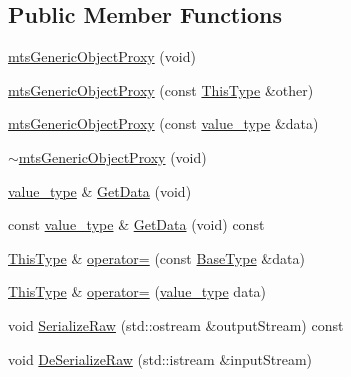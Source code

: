 \subsection*{Public Member Functions}
\begin{DoxyCompactItemize}
\item 
\hyperlink{classmts_generic_object_proxy_ac0ccce059304bd1ec05a51085829a805}{mts\+Generic\+Object\+Proxy} (void)
\item 
\hyperlink{classmts_generic_object_proxy_a6fd8d80a403b92c6466155a613ad1033}{mts\+Generic\+Object\+Proxy} (const \hyperlink{classmts_generic_object_proxy_base_adfa837044848485e7241e56816a74083}{This\+Type} \&other)
\item 
\hyperlink{classmts_generic_object_proxy_a94181dcfd327597df5042d21738d1ace}{mts\+Generic\+Object\+Proxy} (const \hyperlink{classmts_generic_object_proxy_a4c47d4b184e02d7443de1face033af34}{value\+\_\+type} \&data)
\item 
\hyperlink{classmts_generic_object_proxy_ac4bbb9f96ef9a63383e23c5407930dce}{$\sim$mts\+Generic\+Object\+Proxy} (void)
\item 
\hyperlink{classmts_generic_object_proxy_a4c47d4b184e02d7443de1face033af34}{value\+\_\+type} \& \hyperlink{classmts_generic_object_proxy_ab55dbcddbcd3b9db0e8e4326b63a8cf1}{Get\+Data} (void)
\item 
const \hyperlink{classmts_generic_object_proxy_a4c47d4b184e02d7443de1face033af34}{value\+\_\+type} \& \hyperlink{classmts_generic_object_proxy_ae845cb9d57238d227c98a25d08d54dff}{Get\+Data} (void) const 
\item 
\hyperlink{classmts_generic_object_proxy_base_adfa837044848485e7241e56816a74083}{This\+Type} \& \hyperlink{classmts_generic_object_proxy_abe0a80b1ba8c341a88c3883a1a0dfaf8}{operator=} (const \hyperlink{classcmn_generic_object}{Base\+Type} \&data)
\item 
\hyperlink{classmts_generic_object_proxy_base_adfa837044848485e7241e56816a74083}{This\+Type} \& \hyperlink{classmts_generic_object_proxy_a3a460aa4223fafdab54875e316a9eb81}{operator=} (\hyperlink{classmts_generic_object_proxy_a4c47d4b184e02d7443de1face033af34}{value\+\_\+type} data)
\item 
void \hyperlink{classmts_generic_object_proxy_acde3a483210a45b72db91d8e01a04f36}{Serialize\+Raw} (std\+::ostream \&output\+Stream) const 
\item 
void \hyperlink{classmts_generic_object_proxy_a34d00d099372fc845d6d7fa634e6dbaf}{De\+Serialize\+Raw} (std\+::istream \&input\+Stream)
\item 

\end{DoxyCompactItemize}
